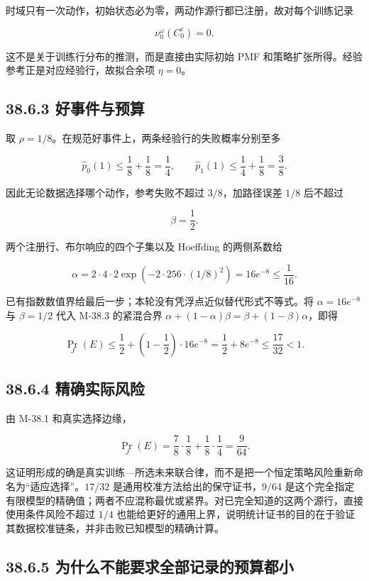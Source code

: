 \documentclass[
  11pt,
  oneside]{book}
\begin{document}
时域只有一次动作，初始状态必为零，两动作源行都已注册，故对每个训练记录

\[\nu_0^\omega(C_0^c)=0.\]

这不是关于训练行分布的推测，而是直接由实际初始 PMF 和策略扩张所得。经验参考正是对应经验行，故拟合余项 \(\eta=0\)。

\subsection{38.6.3 好事件与预算}\label{ux597dux4e8bux4ef6ux4e0eux9884ux7b97}

取 \(\rho=1/8\)。在规范好事件上，两条经验行的失败概率分别至多

\[\widehat p_0(1)\le\frac18+\frac18=\frac14,\qquad
\widehat p_1(1)\le\frac14+\frac18=\frac38.\]

因此无论数据选择哪个动作，参考失败不超过 \(3/8\)，加路径误差 \(1/8\) 后不超过

\[\beta=\frac12.\]

两个注册行、布尔响应的四个子集以及 Hoeffding 的两侧系数给

\[\alpha
=2\cdot4\cdot2\exp\!\left(-2\cdot256\cdot(1/8)^2\right)
=16e^{-8}\le\frac1{16}.\]

已有指数数值界给最后一步；本轮没有凭浮点近似替代形式不等式。将 \(\alpha=16e^{-8}\) 与 \(\beta=1/2\) 代入 M-38.3 的紧混合界 \(\alpha+(1-\alpha)\beta=\beta+(1-\beta)\alpha\)，即得

\[\Pr_J(E)\le\frac12+\left(1-\frac12\right)\cdot16e^{-8}=\frac12+8e^{-8}\le\frac{17}{32}<1.\]

\subsection{38.6.4 精确实际风险}\label{ux7cbeux786eux5b9eux9645ux98ceux9669}

由 M-38.1 和真实选择边缘，

\[\Pr_J(E)=
\frac78\cdot\frac18+\frac18\cdot\frac14
=\frac9{64}.\]

这证明形成的确是真实训练---所选未来联合律，而不是把一个恒定策略风险重新命名为``适应选择''。\(17/32\) 是通用校准方法给出的保守证书，\(9/64\) 是这个完全指定有限模型的精确值；两者不应混称最优或紧界。对已完全知道的这两个源行，直接使用条件风险不超过 \(1/4\) 也能给更好的通用上界，说明统计证书的目的在于验证其数据校准链条，并非击败已知模型的精确计算。

\subsection{38.6.5 为什么不能要求全部记录的预算都小}\label{ux4e3aux4ec0ux4e48ux4e0dux80fdux8981ux6c42ux5168ux90e8ux8bb0ux5f55ux7684ux9884ux7b97ux90fdux5c0f}
\end{document}
